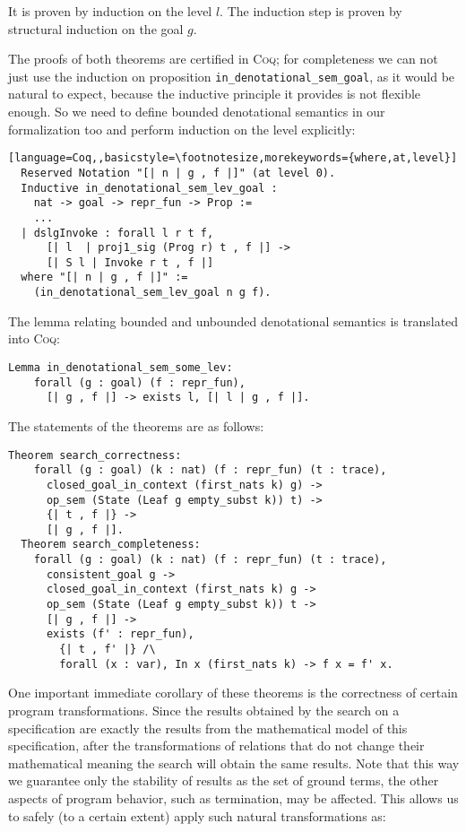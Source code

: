 It is proven by induction on the level $l$. The induction step is proven by structural induction on the goal $g$.

The proofs of both theorems are certified in \textsc{Coq}; for completeness we can not just use the induction on proposition \lstinline|in_denotational_sem_goal|, as it would be natural to expect,
because the inductive principle it provides is not flexible enough. So we need to define bounded denotational semantics in our formalization too and perform
induction on the level explicitly:

\begin{lstlisting}[language=Coq,,basicstyle=\footnotesize,morekeywords={where,at,level}]
  Reserved Notation "[| n | g , f |]" (at level 0).
  Inductive in_denotational_sem_lev_goal :
    nat -> goal -> repr_fun -> Prop :=
    ...
  | dslgInvoke : forall l r t f,
      [| l  | proj1_sig (Prog r) t , f |] ->
      [| S l | Invoke r t , f |]
  where "[| n | g , f |]" :=
    (in_denotational_sem_lev_goal n g f).
\end{lstlisting}

The lemma relating bounded and unbounded denotational semantics is {\color{red} translated} into \textsc{Coq}:

\begin{lstlisting}[language=Coq,basicstyle=\footnotesize]
  Lemma in_denotational_sem_some_lev:
    forall (g : goal) (f : repr_fun),
      [| g , f |] -> exists l, [| l | g , f |].
\end{lstlisting}

The statements of the theorems are as follows:

\begin{lstlisting}[language=Coq,basicstyle=\footnotesize]
  Theorem search_correctness:
    forall (g : goal) (k : nat) (f : repr_fun) (t : trace),
      closed_goal_in_context (first_nats k) g) ->
      op_sem (State (Leaf g empty_subst k)) t) ->
      {| t , f |} ->
      [| g , f |].
  Theorem search_completeness:
    forall (g : goal) (k : nat) (f : repr_fun) (t : trace),
      consistent_goal g ->
      closed_goal_in_context (first_nats k) g ->
      op_sem (State (Leaf g empty_subst k)) t ->
      [| g , f |] ->
      exists (f' : repr_fun),
        {| t , f' |} /\
        forall (x : var), In x (first_nats k) -> f x = f' x.
\end{lstlisting}

One important immediate corollary of these theorems is the correctness of certain program transformations. Since the results obtained by the search on a
specification are exactly the results from the mathematical model of this specification, after the transformations of relations that do not change their
mathematical meaning the search will obtain the same results. Note that this way we guarantee only the stability of results as the set of ground terms,
the other aspects of program behavior, such as termination, may be affected. This allows us to safely (to a certain extent) apply such natural
transformations as:

